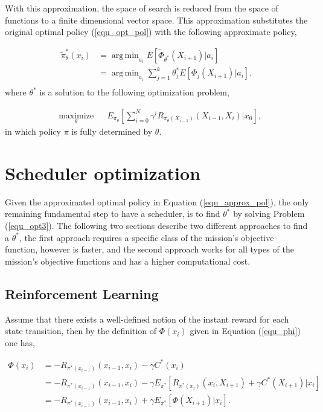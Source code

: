 \documentclass[12pt]{aastex62}
\theoremstyle{definition}
\DeclareMathOperator*{\argmin}{arg\,min}
\begin{document}
With this approximation, the space of search is reduced from the space of functions to a finite dimensional vector space. This approximation substitutes the original optimal policy (\ref{equ_opt_pol}) with the following approximate policy,

\begin{equation}\label{equ_approx_pol}
\begin{aligned}
\tilde{\pi}_{\theta}^*(x_{i})& = \argmin_{a_{i}} E[ \tilde{\Phi}_{\theta^*}(X_{i+1}) | a_{i}]\\
& =  \argmin_{a_{i}} \sum_{j=1}^k \theta^*_j E[\Phi_j(X_{i+1}) | a_{i}],\\
\end{aligned}
\end{equation}
where $\theta^*$ is a solution to the following optimization problem,

\begin{equation}\label{equ_opt3}
\begin{aligned}
& \underset{\theta}{\text{maximize}}
& & E_{\pi_{\theta}}[\sum_{i=0}^N \gamma^i R_{\pi_{\theta} (X_{i-1})}(X_{{i-1}}, X_{i}) | x_0],
\end{aligned}
\end{equation}
in which policy $\pi$ is fully determined by $\theta$.
 
 
\section{Scheduler optimization}\label{sec_opt}

Given the approximated optimal policy in Equation (\ref{equ_approx_pol}), the only remaining fundamental step to have a scheduler, is to find $\theta^*$ by solving Problem (\ref{equ_opt3}). The following two sections describe two different approaches to find a $\theta^*$, the first approach requires a specific class of the mission's objective function, however is faster, and the second approach works for all types of the mission's objective functions and has a higher computational cost. 

\subsection{Reinforcement Learning}

Assume that there exists a well-defined notion of the instant reward for each state transition, then by the definition of $\Phi(x_{{i}})$ given in Equation (\ref{equ_phi}) one has,

\begin{equation}
\begin{aligned}
\Phi(x_{i}) &= - R_{\pi^*(x_{i-1})}(x_{i-1},x_i) - \gamma C^*({x_{i}})\\
&= - R_{\pi^*(x_{i-1})}(x_{i-1},x_i) - \gamma E_{\pi^*}[R_{\pi^*(x_{i})}(x_{i},X_{i+1})  +\gamma C^*({X_{{i+1}}})|x_i]\\
&= - R_{\pi^*(x_{i-1})}(x_{i-1},x_i)  + \gamma E_{\pi^*}[\Phi(X_{{i+1}})|x_i].\\
\end{aligned}
\end{equation}
\end{document}
